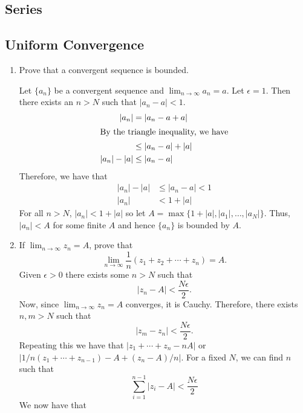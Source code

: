 \subsection{Series}

\subsection{Uniform Convergence}

\begin{enumerate}
\item
  Prove that a convergent sequence is bounded.
  \par\smallskip
  Let \(\{a_n\}\) be a convergent sequence and \(\lim_{n\to\infty}a_n = a\).
  Let \(\epsilon = 1\).
  Then there exists an \(n > N\) such that \(\lvert a_n - a\rvert < 1\).
  \begin{align*}
    \lvert a_n\rvert & = \lvert a_n - a + a\rvert\\
    \intertext{By the triangle inequality, we have}
                     & \leq \lvert a_n - a\rvert + \lvert a\rvert\\
    \lvert a_n\rvert - \lvert a\rvert & \leq \lvert a_n - a\rvert
  \end{align*}
  Therefore, we have that
  \begin{align*}
    \lvert a_n\rvert - \lvert a\rvert & \leq\lvert a_n - a\rvert < 1\\
    \lvert a_n\rvert & < 1 + \lvert a\rvert
  \end{align*}
  For all \(n > N\), \(\lvert a_n\rvert < 1 + \lvert a\rvert\) so let
  \(A = \max\bigl\{1 + \lvert a\rvert,\lvert a_1\rvert,\ldots,
  \lvert a_N\rvert\bigr\}\).
  Thus, \(\lvert a_n\rvert < A\) for some finite \(A\) and hence \(\{a_n\}\) is
  bounded by \(A\).
\item
  If \(\lim_{n\to\infty}z_n = A\), prove that
  \[
  \lim_{n\to\infty}\frac{1}{n}(z_1 + z_2 + \cdots + z_n) = A.
  \]
  Given \(\epsilon > 0\) there exists some \(n > N\) such that
  \[
  \lvert z_n - A\rvert < \frac{N\epsilon}{2}.
  \]
  Now, since \(\lim_{n\to\infty}z_n = A\) converges, it is Cauchy.
  Therefore, there exists \(n,m > N\) such that
  \[
  \lvert z_m - z_n\rvert < \frac{N\epsilon}{2}.
  \]
  Repeating this we have that \(\lvert z_1 + \cdots + z_n - nA\rvert\) or
  \(\lvert 1/n(z_1 + \cdots + z_{n - 1}) - A + (z_n - A)/n\rvert\).
  For a fixed \(N\), we can find \(n\) such that
  \[
  \sum_{i = 1}^{n - 1}\lvert z_i - A\rvert < \frac{N\epsilon}{2}
  \]
  We now have that
  \begin{align*}

\end{align*}
\end{enumerate}
